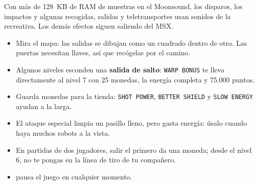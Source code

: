 Con más de 128~KB de RAM de muestras en el Moonsound, los disparos, los impactos y algunas recogidas, salidas y teletransportes usan sonidos de la recreativa. Los demás efectos siguen saliendo del MSX.


\begin{itemize}
\item Mira el mapa: las salidas se dibujan como un cuadrado dentro de otro. Las puertas necesitan llaves, así que recógelas por el camino.
\item Algunos niveles esconden una \textbf{salida de salto}: \texttt{WARP BONUS} te lleva directamente al nivel 7 con 25 monedas, la energía completa y 75.000 puntos.
\item Guarda monedas para la tienda: \texttt{SHOT POWER}, \texttt{BETTER SHIELD} y \texttt{SLOW ENERGY} ayudan a la larga.
\item El ataque especial limpia un pasillo lleno, pero gasta energía: úsalo cuando haya muchos robots a la vista.
\item En partidas de dos jugadores, salir el primero da una moneda; desde el nivel 6, no te pongas en la línea de tiro de tu compañero.
\item {} pausa el juego en cualquier momento.
\end{itemize}
